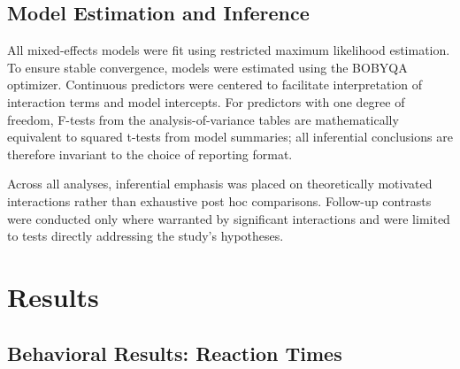 \documentclass[preprint,12pt, authoryear, review]{elsarticle}
\begin{document}
	\subsection{Model Estimation and Inference}
	All mixed-effects models were fit using restricted maximum likelihood estimation. To ensure stable convergence, models were estimated using the BOBYQA optimizer. Continuous predictors were centered to facilitate interpretation of interaction terms and model intercepts. For predictors with one degree of freedom, F-tests from the analysis-of-variance tables are mathematically equivalent to squared t-tests from model summaries; all inferential conclusions are therefore invariant to the choice of reporting format.
	
	Across all analyses, inferential emphasis was placed on theoretically motivated interactions rather than exhaustive post hoc comparisons. Follow-up contrasts were conducted only where warranted by significant interactions and were limited to tests directly addressing the study’s hypotheses.

\section{Results}

	\subsection{Behavioral Results: Reaction Times}
\end{document}

